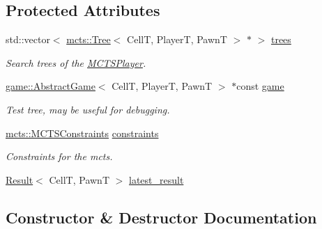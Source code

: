 \subsection*{Protected Attributes}
\begin{DoxyCompactItemize}
\item 
std\+::vector$<$ \hyperlink{classmcts_1_1_tree}{mcts\+::\+Tree}$<$ CellT, PlayerT, PawnT $>$ $\ast$ $>$ \hyperlink{classmcts_1_1_m_c_t_s_player_a4b0bb8828ed63c2f24fa4cf2cab14e7d}{trees}
\begin{DoxyCompactList}\small\item\em Search trees of the \hyperlink{classmcts_1_1_m_c_t_s_player}{M\+C\+T\+S\+Player}. \end{DoxyCompactList}\item 
\hyperlink{classgame_1_1_abstract_game}{game\+::\+Abstract\+Game}$<$ CellT, PlayerT, PawnT $>$ $\ast$const \hyperlink{classmcts_1_1_m_c_t_s_player_ae4ff52c6d9e13dc5801b53bb11e32a64}{game}
\begin{DoxyCompactList}\small\item\em Test tree, may be useful for debugging. \end{DoxyCompactList}\item 
\hyperlink{structmcts_1_1_m_c_t_s_constraints}{mcts\+::\+M\+C\+T\+S\+Constraints} \hyperlink{classmcts_1_1_m_c_t_s_player_a58cb7a7b1286e635d548ebe0405d79e6}{constraints}
\begin{DoxyCompactList}\small\item\em Constraints for the mcts. \end{DoxyCompactList}\item 
\hyperlink{structmcts_1_1_result}{Result}$<$ CellT, PawnT $>$ \hyperlink{classmcts_1_1_m_c_t_s_player_ac9924c9244797868d40ffa64d715aa18}{latest\+\_\+result}
\end{DoxyCompactItemize}


\subsection{Constructor \& Destructor Documentation}
\mbox{\label{classmcts_1_1_m_c_t_s_player_a7daa85ddaab8a7dab66b0f229629d37c}} 
